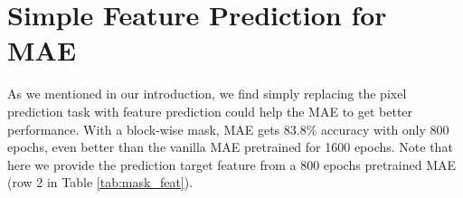 \documentclass[runningheads]{llncs}
\begin{document}
\begin{table}[t]
\centering \caption{Illustrating the effect of different injection feature. We show fine-tune accuracy (\%) on ImageNet-K.}
\vspace{-3mm}
\label{tab:cross_feature}
\end{table}

\section{Simple Feature Prediction for MAE}
As we mentioned in our introduction, we find simply replacing the pixel prediction task with feature prediction could help the MAE to get better performance. With a block-wise mask, MAE gets 83.8\% accuracy with only 800 epochs, even better than the vanilla MAE pretrained for 1600 epochs. Note that here we provide the prediction target feature from a 800 epochs pretrained MAE (row 2 in Table \ref{tab:mask_feat}).


\begin{table}[t]
	\centering
	\footnotesize
	\caption{Results of bootstrapped feature prediction. The performance is improved from 83.2\% to 83.6\% with the MAE features as prediction targets for 300 epochs, achieving the same performance with the vanilla MAE with pre-trained 1600 epochs. When the model is pre-trained for 800 epochs, it achieves 83.8\%.}
	\label{tab:mask_feat}


	\vspace{-4mm}
\end{table}
\end{document}
